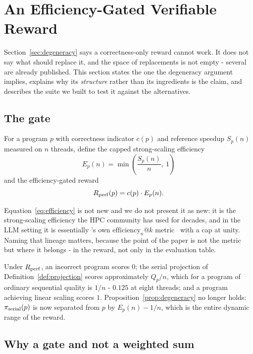 \section{An Efficiency-Gated Verifiable Reward}
\label{sec:reward}

Section~\ref{sec:degeneracy} says a correctness-only reward cannot work. It
does not say what should replace it, and the space of replacements is not
empty - several are already published. This section states the one the
degeneracy argument implies, explains why its \emph{structure} rather than its
ingredients is the claim, and describes the suite we built to test it against
the alternatives.

\subsection{The gate}

For a program $p$ with correctness indicator $c(p)$ and reference speedup
$S_p(n)$ measured on $n$ threads, define the capped strong-scaling efficiency
\begin{equation}
  E_p(n) = \min\!\left(\frac{S_p(n)}{n},\ 1\right)
  \label{eq:efficiency}
\end{equation}
and the efficiency-gated reward
\begin{equation}
  R_{\mathrm{perf}}(p) = c(p)\cdot E_p(n).
  \label{eq:rgate}
\end{equation}

Equation~\eqref{eq:efficiency} is not new and we do not present it as new: it
is the strong-scaling efficiency the HPC community has used for decades, and
in the LLM setting it is essentially \ParEval's own $\mathrm{efficiency}_n@k$
metric~\cite{pareval} with a cap at unity. Naming that lineage matters, because
the point of the paper is not the metric but where it belongs - in the reward,
not only in the evaluation table.

Under $R_{\mathrm{perf}}$, an incorrect program scores $0$; the serial projection of
Definition~\ref{def:projection} scores approximately $Q_p/n$, which for a
program of ordinary sequential quality is $1/n$ - $0.125$ at eight threads;
and a program achieving linear scaling scores $1$. Proposition~\ref{prop:degeneracy}
no longer holds: $\pi_{\mathrm{serial}}(p)$ is now separated from $p$ by
$E_p(n) - 1/n$, which is the entire dynamic range of the reward.

\subsection{Why a gate and not a weighted sum}

